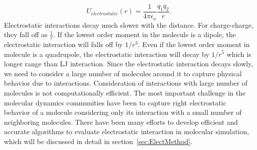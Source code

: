 \begin{equation}
U_{electrostatic}(r) = \frac{1}{4\pi \epsilon_o}\frac{q_1 q_2}{r}.
\label{eq:Coulomb}
\end{equation}
Electrostatic interactions decay much slower with the distance. For charge-charge, they fall off as $ \frac{1}{r}$. If the lowest order moment in the molecule is a dipole, the electrostatic interaction will falls off by ${1}/{r^3}$. Even if the lowest order moment in molecule is a quadrupole, the electrostatic interaction will decay by ${1}/{r^5}$ which is longer range than LJ interaction. Since the electrostatic interaction decays slowly, we need to consider a large number of molecules around it to capture physical behavior due to interactions. Consideration of interactions with large number of molecules is not computationally efficient. The most important challenge in the molecular dynamics communities have been to capture right electrostatic behavior of a molecule considering only its interaction with a small number of neighboring molecules. There have been many efforts to develop efficient and accurate algorithms to evaluate electrostatic interaction in molecular simulation, which will be discussed in detail in section~\ref{sec:ElectMethod}.  

 
